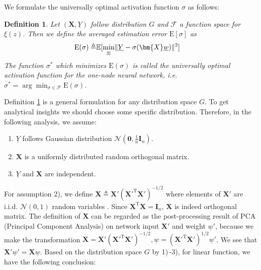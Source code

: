 \documentclass[conference]{IEEEtran}
\newtheorem{definition}{Definition}
\DeclarePairedDelimiter\norm{\lVert}{\rVert}
\def\E{\mathbb{E}}
\def\T{\mathrm{T}}
\begin{document}
We formulate the universally optimal activation function $\sigma$ as follows:
\begin{definition}\label{def:ug}
Let $(\bm{X}, \underline{Y})$ follow distribution $G$ and
$\mathcal{F}$ a function space for $\xi(z)$. Then
we define the averaged estimation error $\mathrm{E}[\sigma]$ as
\begin{align}\label{eq:ug}
\mathrm{E}(\sigma) \triangleq & \E[ \min_{\underline{w}} \norm{\underline{Y} - \sigma(\bm{X} \underline{w})}^2] 
\end{align}
The function $\sigma^*$ which minimizes $\mathrm{E}(\sigma)$
is called the universally optimal activation function for the one-node neural network,
i.e. $\sigma^* = \arg\min_{\sigma \in \mathcal{F}} \mathrm{E}(\sigma)$.
\end{definition}

Definition \ref{def:ug} is a general formulation for any distribution space $G$.
To get analytical insights we should choose some specific distribution.
Therefore, in the following analysis, we assume:
\begin{enumerate}
\item $\underline{Y}$ follows Gaussian distribution $\mathcal{N}(\mathbf{0},\frac{1}{n} \mathbf{I}_n)$.
\item $\bm{X}$ is a uniformly distributed random orthogonal matrix.
\item $\underline{Y}$ and $\bm{X}$ are independent.
\end{enumerate}
For assumption 2), we define $\bm{X} \triangleq \bm{X}'(\bm{X}'^\T\bm{X}')^{-1/2}$
where elements of $\bm{X}'$ are i.i.d. $\mathcal{N}(0, 1)$ random variables \cite[Proposition 7.1]{eaton1989group}.
Since $\bm{X}^\T\bm{X} = \mathbf{I}_n$, $\bm{X}$ is indeed orthogonal matrix.
The definition of $\bm{X}$ can be regarded as the post-processing result of PCA (Principal Component Analysis)
on network input $\bm{X}'$ and weight $\underline{w}'$, because
we make the transformation $\bm{X} = \bm{X}'(\bm{X}'^\T\bm{X}')^{-1/2}, \underline{w} = (\bm{X}'^\T\bm{X}')^{1/2}\underline{w}'$.
We see that $\bm{X}'\underline{w}' = \bm{X}\underline{w}$.
Based on the distribution space $G$ by 1)\,-3), for linear function, we have the following conclusion:
\end{document}
